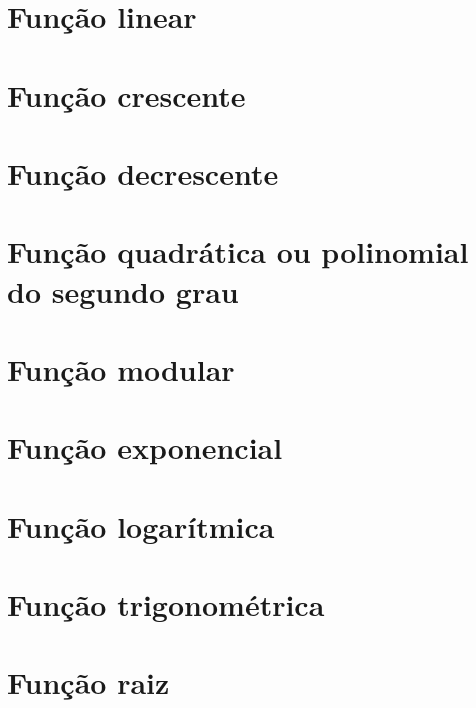 \chapter{Função linear}

\chapter{Função crescente}

\chapter{Função decrescente}

\chapter{Função quadrática ou polinomial do segundo grau}

\chapter{Função modular}

\chapter{Função exponencial}

\chapter{Função logarítmica}

\chapter{Função trigonométrica}

\chapter{Função raiz}